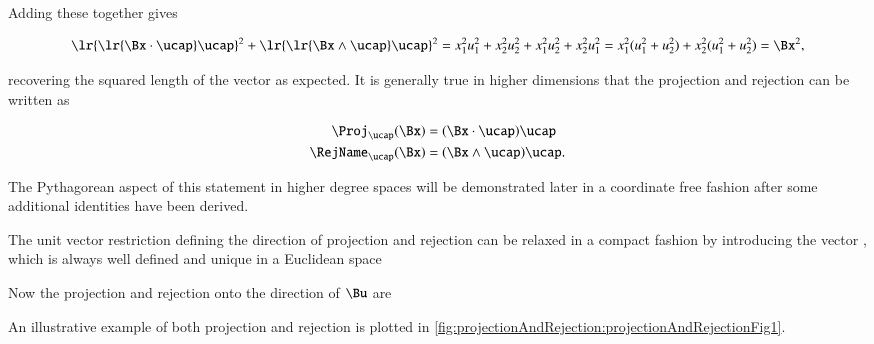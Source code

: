 Adding these together gives

\begin{dmath}\label{eqn:SimpleProducts2:780}
\lr{ \lr{\Bx \cdot \ucap } \ucap }^2 + \lr{ \lr{\Bx \wedge \ucap } \ucap }^2
=
x_1^2 u_1^2 + x_2^2 u_2^2
+x_1^2 u_2^2 + x_2^2 u_1^2
=
x_1^2 ( u_1^2 + u_2^2 )
+
x_2^2 ( u_1^2 + u_2^2 )
=
\Bx^2,
\end{dmath}

recovering the squared length of the vector as expected.
It is generally true in higher dimensions that the projection and rejection can be written as

\begin{dmath}\label{eqn:SimpleProducts2:800}
\begin{aligned}
\Proj_\ucap(\Bx) &= (\Bx \cdot \ucap) \ucap \\
\RejName_\ucap(\Bx) &= (\Bx \wedge \ucap) \ucap.
\end{aligned}
\end{dmath}

The Pythagorean aspect of this statement in higher degree spaces
will be demonstrated later in a coordinate free fashion after some additional identities have been derived.

The unit vector restriction defining the direction of projection and rejection can be relaxed in a compact fashion by introducing the vector , which is always well defined and unique in a Euclidean space


Now the projection and rejection onto the direction of \( \Bu \) are


An illustrative example of both projection and rejection is plotted in \cref{fig:projectionAndRejection:projectionAndRejectionFig1}.


